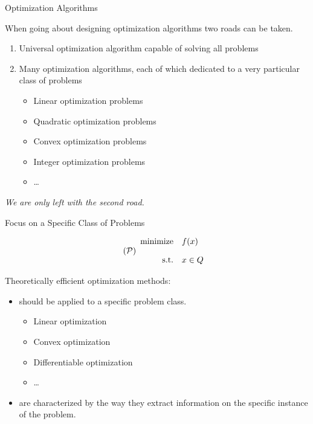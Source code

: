\documentclass[9pt]{beamer}
\begin{document}
\begin{frame}{Optimization Algorithms}

  When going about designing optimization algorithms two roads can be taken.

  \vfill
  
  \begin{enumerate}
    \setlength\itemsep{2em}
  \item Universal optimization algorithm capable of solving all problems \\[1em]
  \item Many optimization algorithms, each of which dedicated to a very particular class of problems
    \begin{itemize}
      \setlength\itemsep{1em}
    \item Linear optimization problems
    \item Quadratic optimization problems
    \item Convex optimization problems
    \item Integer optimization problems
    \item \dots
    \end{itemize}
  \end{enumerate}

  \vfill

  \emph{We are only left with the second road.}
  
\end{frame}

\begin{frame}{Focus on a Specific Class of Problems}

  \begin{center}
    \begin{tcolorbox}[width=6cm]
      \begin{equation}
        \tag{$\mc P$}
        \begin{array}{rl}
          \minimize & f(x) \\[1em]
          \st & x \in Q
        \end{array}
      \end{equation}
    \end{tcolorbox}
  \end{center}
  \vfill

  Theoretically efficient optimization methods:
  \begin{itemize}
    \setlength\itemsep{2em}
  \item should be applied to a specific problem class.
    \begin{itemize}
      \setlength\itemsep{1em}
    \item Linear optimization
    \item Convex optimization
    \item Differentiable optimization
    \item \dots
    \end{itemize}
  \item are characterized by the way they extract information on the specific instance of the problem.
  \end{itemize}
  
\end{frame}
\end{document}
